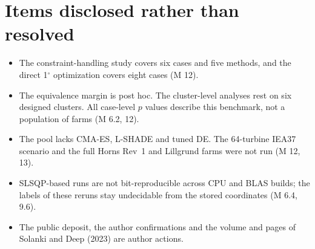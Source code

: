\documentclass[11pt,a4paper]{article}
\begin{document}
\section*{Items disclosed rather than resolved}
\begin{itemize}
\item The constraint-handling study covers six cases and five methods, and the direct 1$^\circ$ optimization covers
eight cases (M 12).
\item The equivalence margin is post hoc. The cluster-level analyses rest on six designed clusters. All case-level
$p$ values describe this benchmark, not a population of farms (M 6.2, 12).
\item The pool lacks CMA-ES, L-SHADE and tuned DE. The 64-turbine IEA37 scenario and the full Horns Rev~1 and
Lillgrund farms were not run (M 12, 13).
\item SLSQP-based runs are not bit-reproducible across CPU and BLAS builds; the labels of these reruns stay
undecidable from the stored coordinates (M 6.4, 9.6).
\item The public deposit, the author confirmations and the volume and pages of Solanki and Deep (2023) are author
actions.
\end{itemize}
\end{document}
